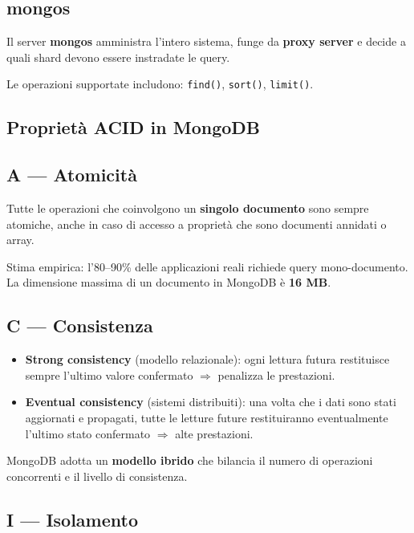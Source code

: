 \subsection*{mongos}

Il server \textbf{mongos} amministra l'intero sistema, funge da \textbf{proxy server} e decide a quali shard devono essere instradate le query.

Le operazioni supportate includono: \texttt{find()}, \texttt{sort()}, \texttt{limit()}.

\subsection{Proprietà ACID in MongoDB}

\subsection*{A — Atomicità}

Tutte le operazioni che coinvolgono un \textbf{singolo documento} sono sempre atomiche, anche in caso di accesso a proprietà che sono documenti annidati o array.

Stima empirica: l'80--90\% delle applicazioni reali richiede query mono-documento. La dimensione massima di un documento in MongoDB è \textbf{16 MB}.

\subsection*{C — Consistenza}

\begin{itemize}
	\item \textbf{Strong consistency} (modello relazionale): ogni lettura futura restituisce sempre l'ultimo valore confermato $\Rightarrow$ penalizza le prestazioni.
	\item \textbf{Eventual consistency} (sistemi distribuiti): una volta che i dati sono stati aggiornati e propagati, tutte le letture future restituiranno eventualmente l'ultimo stato confermato $\Rightarrow$ alte prestazioni.
\end{itemize}

MongoDB adotta un \textbf{modello ibrido} che bilancia il numero di operazioni concorrenti e il livello di consistenza.

\subsection*{I — Isolamento}

